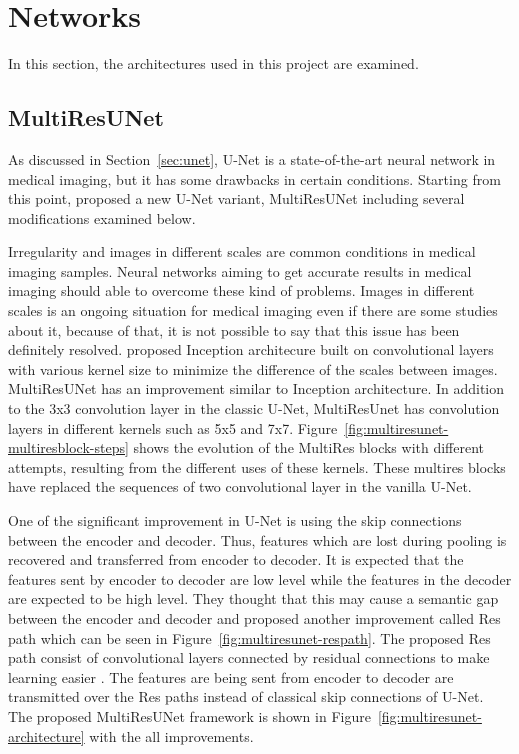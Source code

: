\section{Networks}\label{sec:networks}

    In this section, the architectures used in this project are examined.

    \subsection{MultiResUNet}\label{sec:multiresunet}

        As discussed in Section~\ref{sec:unet}, U-Net is a state-of-the-art neural network in medical imaging, but it has some drawbacks in certain conditions.
        Starting from this point, \citet{ibtehaz2020multiresunet} proposed a new U-Net variant, MultiResUNet including several modifications examined below.

        

        Irregularity and images in different scales are common conditions in medical imaging samples.
        Neural networks aiming to get accurate results in medical imaging should able to overcome these kind of problems.
        Images in different scales is an ongoing situation for medical imaging even if there are some studies about it, because of that, it is not possible to say that this issue has been definitely resolved.
        \citet{szegedy2015going} proposed Inception architecure built on convolutional layers with various kernel size to minimize the difference of the scales between images.
        MultiResUNet has an improvement similar to Inception architecture.
        In addition to the 3x3 convolution layer in the classic U-Net, MultiResUnet has convolution layers in different kernels such as 5x5 and 7x7.
        Figure~\ref{fig:multiresunet-multiresblock-steps} shows the evolution of the MultiRes blocks with different attempts, resulting from the different uses of these kernels.
        These multires blocks have replaced the sequences of two convolutional layer in the vanilla U-Net.

        

        One of the significant improvement in U-Net is using the skip connections between the encoder and decoder.
        Thus, features which are lost during pooling is recovered and transferred from encoder to decoder.
        It is expected that the features sent by encoder to decoder are low level while the features in the decoder are expected to be high level.
        They thought that this may cause a semantic gap between the encoder and decoder and proposed another improvement called Res path which can be seen in Figure~\ref{fig:multiresunet-respath}.
        The proposed Res path consist of convolutional layers connected by residual connections to make learning easier \cite{drozdzal2016importance}.
        The features are being sent from encoder to decoder are transmitted over the Res paths instead of classical skip connections of U-Net.
        The proposed MultiResUNet framework is shown in Figure~\ref{fig:multiresunet-architecture} with the all improvements.

